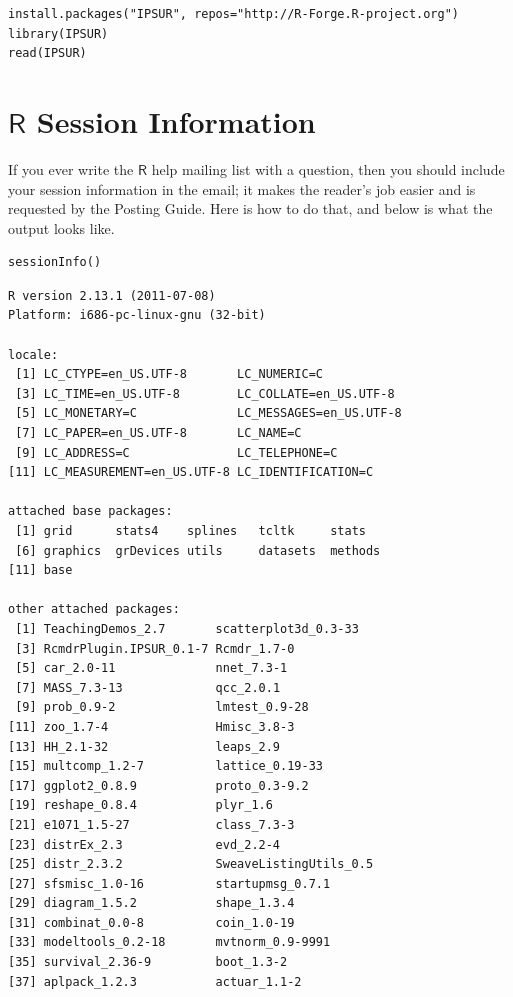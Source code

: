 \documentclass[captions=tableheading]{scrbook}
\begin{document}
\begin{example}
\begin{verbatim}
install.packages("IPSUR", repos="http://R-Forge.R-project.org")
library(IPSUR)
read(IPSUR)
\end{verbatim}


\appendix
\chapter{\(\mathsf{R}\) Session Information}
\label{sec-17}
\label{cha-R-Session-Information}


If you ever write the \(\mathsf{R}\) help mailing list with a question, then you should include your session information in the email; it makes the reader's job easier and is requested by the Posting Guide. Here is how to do that, and below is what the output looks like.


\begin{verbatim}
sessionInfo()
\end{verbatim}


\begin{verbatim}
R version 2.13.1 (2011-07-08)
Platform: i686-pc-linux-gnu (32-bit)

locale:
 [1] LC_CTYPE=en_US.UTF-8       LC_NUMERIC=C              
 [3] LC_TIME=en_US.UTF-8        LC_COLLATE=en_US.UTF-8    
 [5] LC_MONETARY=C              LC_MESSAGES=en_US.UTF-8   
 [7] LC_PAPER=en_US.UTF-8       LC_NAME=C                 
 [9] LC_ADDRESS=C               LC_TELEPHONE=C            
[11] LC_MEASUREMENT=en_US.UTF-8 LC_IDENTIFICATION=C       

attached base packages:
 [1] grid      stats4    splines   tcltk     stats    
 [6] graphics  grDevices utils     datasets  methods  
[11] base     

other attached packages:
 [1] TeachingDemos_2.7       scatterplot3d_0.3-33   
 [3] RcmdrPlugin.IPSUR_0.1-7 Rcmdr_1.7-0            
 [5] car_2.0-11              nnet_7.3-1             
 [7] MASS_7.3-13             qcc_2.0.1              
 [9] prob_0.9-2              lmtest_0.9-28          
[11] zoo_1.7-4               Hmisc_3.8-3            
[13] HH_2.1-32               leaps_2.9              
[15] multcomp_1.2-7          lattice_0.19-33        
[17] ggplot2_0.8.9           proto_0.3-9.2          
[19] reshape_0.8.4           plyr_1.6               
[21] e1071_1.5-27            class_7.3-3            
[23] distrEx_2.3             evd_2.2-4              
[25] distr_2.3.2             SweaveListingUtils_0.5 
[27] sfsmisc_1.0-16          startupmsg_0.7.1       
[29] diagram_1.5.2           shape_1.3.4            
[31] combinat_0.0-8          coin_1.0-19            
[33] modeltools_0.2-18       mvtnorm_0.9-9991       
[35] survival_2.36-9         boot_1.3-2             
[37] aplpack_1.2.3           actuar_1.1-2           


\end{verbatim}
\end{example}
\end{document}
